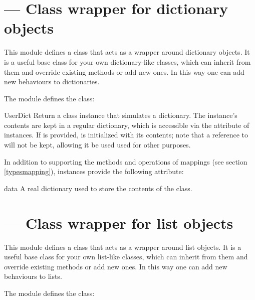 \section{ ---
         Class wrapper for dictionary objects}


This module defines a class that acts as a wrapper around
dictionary objects.  It is a useful base class for
your own dictionary-like classes, which can inherit from
them and override existing methods or add new ones.  In this way one
can add new behaviours to dictionaries.

The  module defines the  class:

\begin{classdesc}{UserDict}{}
Return a class instance that simulates a dictionary.  The instance's
contents are kept in a regular dictionary, which is accessible via the
 attribute of  instances.  If
 is provided,  is initialized with its
contents; note that a reference to  will not be kept, 
allowing it be used used for other purposes.
\end{classdesc}

In addition to supporting the methods and operations of mappings (see
section \ref{typesmapping}),  instances provide the
following attribute:

\begin{memberdesc}{data}
A real dictionary used to store the contents of the 
class.
\end{memberdesc}


\section{ ---
         Class wrapper for list objects}



This module defines a class that acts as a wrapper around
list objects.  It is a useful base class for
your own list-like classes, which can inherit from
them and override existing methods or add new ones.  In this way one
can add new behaviours to lists.

The  module defines the  class:

